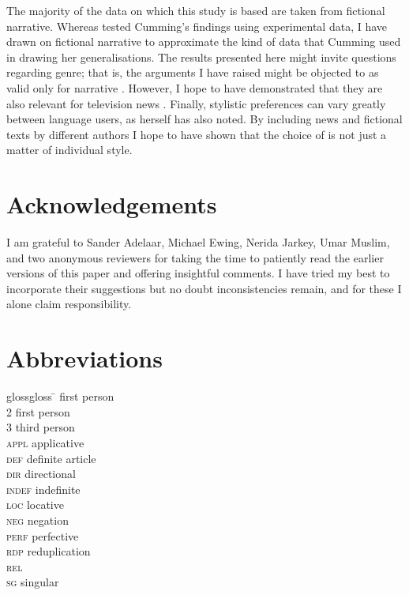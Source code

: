 \documentclass[output=paper
,modfonts
,nonflat]{langsci/langscibook}
\begin{document}
The majority of the data on which this study is based are taken from fictional narrative. Whereas \citet{Shiohara2015} tested Cumming’s findings using experimental data, I have drawn on fictional narrative to approximate the kind of data that Cumming used in drawing her generalisations. The results presented here might invite questions regarding genre; that is, the arguments I have raised might be objected to as valid only for narrative . However, I hope to have demonstrated that they are also relevant for television news . Finally, stylistic preferences can vary greatly between language users, as \citet[174--175]{Cumming1991} herself has also noted. By including news  and fictional texts by different authors I hope to have shown that the choice of  is not just a matter of individual style.

\section*{Acknowledgements}

I am grateful to Sander Adelaar, Michael Ewing, Nerida Jarkey, Umar Muslim, and two anonymous reviewers for taking the time to patiently read the earlier versions of this paper and offering insightful comments. I have tried my best to incorporate their suggestions but no doubt inconsistencies remain, and for these I alone claim responsibility.

\section*{Abbreviations}

\begin{multicols}{2}
	\begin{tabbing}
		glossgloss \=  \> first person\\
		2 \> first person \\
		3 \> third person\\
		\textsc{appl} \> applicative\\
		\textsc{def} \> definite article\\
		\textsc{dir} \> directional\\
		\textsc{indef} \> indefinite\\ 
		\textsc{loc} \> locative\\
		\textsc{neg} \> negation\\
		\textsc{perf} \> perfective\\
		\textsc{rdp} \> reduplication\\
		\textsc{rel} \> \\
		\textsc{sg} \> singular
	\end{tabbing}
\end{multicols}

\sloppy
\printbibliography[heading=subbibliography,notkeyword=this]
\end{document}
